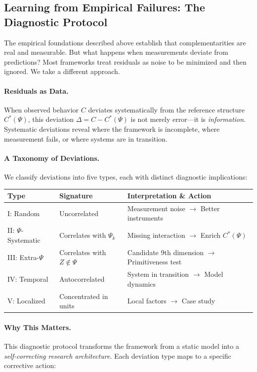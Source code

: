 \subsection{Learning from Empirical Failures: The Diagnostic Protocol}

The empirical foundations described above establish that complementarities 
are real and measurable. But what happens when measurements deviate from 
predictions? Most frameworks treat residuals as noise to be minimized and 
then ignored. We take a different approach.

\paragraph{Residuals as Data.}
When observed behavior $C$ deviates systematically from the reference 
structure $C^*(\Psi)$, this deviation $\Delta = C - C^*(\Psi)$ is not 
merely error---it is \emph{information}. Systematic deviations reveal 
where the framework is incomplete, where measurement fails, or where 
systems are in transition.

\paragraph{A Taxonomy of Deviations.}
We classify deviations into five types, each with distinct diagnostic implications:

\begin{center}
\renewcommand{\arraystretch}{1.3}
\small
\begin{tabular}{@{}llp{5.5cm}@{}}
\toprule
\textbf{Type} & \textbf{Signature} & \textbf{Interpretation \& Action} \\
\midrule
I: Random & Uncorrelated & Measurement noise $\rightarrow$ Better instruments \\
II: $\Psi$-Systematic & Correlates with $\Psi_k$ & Missing interaction $\rightarrow$ Enrich $C^*(\Psi)$ \\
III: Extra-$\Psi$ & Correlates with $Z \notin \Psi$ & Candidate 9th dimension $\rightarrow$ Primitiveness test \\
IV: Temporal & Autocorrelated & System in transition $\rightarrow$ Model dynamics \\
V: Localized & Concentrated in units & Local factors $\rightarrow$ Case study \\
\bottomrule
\end{tabular}
\end{center}

\paragraph{Why This Matters.}
This diagnostic protocol transforms the framework from a static model into 
a \emph{self-correcting research architecture}. Each deviation type maps 
to a specific corrective action:

